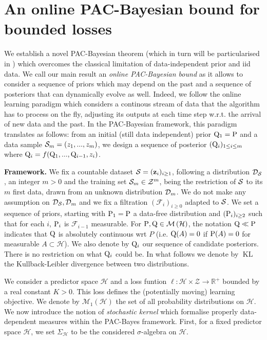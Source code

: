 \section{An online PAC-Bayesian bound for bounded losses}
\label{sec: main_bound}
We establish a novel PAC-Bayesian theorem (which in turn will be particularised in ) which overcomes the classical limitation of data-independent prior and iid data.
We call our main result an \emph{online PAC-Bayesian bound} as it allows to consider a sequence of priors which may depend on the past and a sequence of posteriors that can dynamically evolve as well. Indeed, we follow the online learning paradigm which considers a continous stream of data that the algorithm has to process on the fly, adjusting its outputs at each time step w.r.t. the arrival of new data and the past. In the PAC-Bayesian framework, this paradigm translates as follows: from an initial (still data independent) prior $\Q_1=\P$ and a data sample $\Sm= (z_1,...,z_m)$, we design a sequence of posterior $(\Q_{i})_{1\leq i\leq m }$ where $\Q_{i}= f(\Q_1,...,\Q_{i-1},z_i)$.

\textbf{Framework.}  We fix a countable dataset $\S=(\z_i)_{i\geq 1}$, following a distribution $\D_{\S}$, an integer $m>0$ and the training set $\Sm\in\mathcal{Z}^m$, being the restriction of $\S$ to its $m$ first data, drawn from an unknown distribution $\Dm$. We do not make any assumption on $\D_{\S},\Dm$ and we fix a filtration $(\mathcal{F}_i)_{i\geq 0}$ adapted to $\S$. We set a sequence of priors, starting with $\P_1=\P$ a data-free distribution and $(\P_{i})_{i\geq 2}$ such that for each $i$, $\P_{i}$ is $\mathcal{F}_{i-1}$ measurable.
For $\P,\Q \in \mathcal{M}\left(\mathcal{H}\right)$, the notation $\Q \ll \P$ indicates that $\Q$ is absolutely continuous wrt $P$ (i.e. $\Q(A) = 0$ if $\P(A) = 0$ for measurable $A \subset \mathcal{H}$).
We also denote by $\Q_{i}$ our sequence of candidate posteriors. There is no restriction on what $\Q_{i}$ could be.
In what follows we denote by $\operatorname{KL}$ the Kullback-Leibler divergence between two distributions.

We consider a predictor space $\mathcal{H}$ and a loss funtion $\ell: \mathcal{H}\times \mathcal{Z} \rightarrow \mathbb{R}^+$ bounded by a real constant $K>0$. This loss defines the (potentially moving) learning objective. We denote by $\mathcal{M}_1(\mathcal{H})$ the set of all probability distributions on $\mathcal{H}$.
 We now introduce the notion of \emph{stochastic kernel} \citep{rivasplata2020pac} which formalise properly data-dependent measures within the PAC-Bayes framework. First, for a fixed predictor space $\mathcal{H}$, we set $\Sigma_{\mathcal{H}}$ to be the considered $\sigma$-algebra on $\mathcal{H}$.

